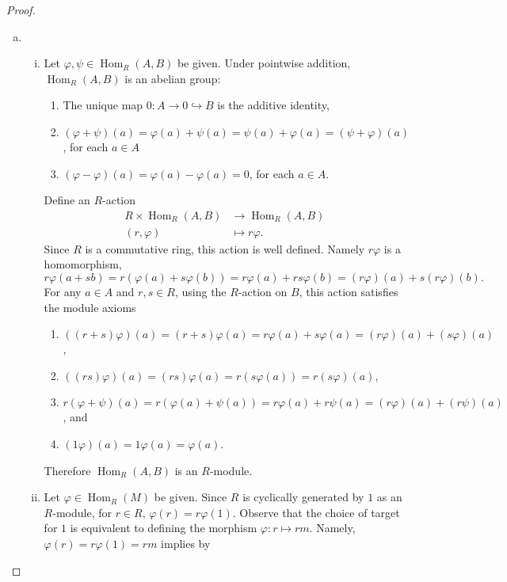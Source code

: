 \documentclass[10pt]{amsart}
\newcommand{\Hom}[2]{\operatorname{Hom}_{#1}\left(#2\right)}
\begin{document}
\begin{thm}
\begin{proof}
	\begin{enumerate}[(a)]
		\item
		\begin{enumerate}[(i)]
			\item
				Let $\varphi, \psi \in \Hom{R}{A,B}$ be given.
				Under pointwise addition, $\Hom{R}{A,B}$ is an abelian group:
				\begin{enumerate}
					\item
						The unique map $0 \colon A \rightarrow 0 \hookrightarrow B$ is the additive identity,
					\item
						$(\varphi + \psi)(a) = \varphi(a) + \psi(a) = \psi(a) + \varphi(a) = (\psi + \varphi)(a)$, for each $a \in A$
					\item
						$(\varphi - \varphi)(a) = \varphi(a) - \varphi(a) = 0$, for each $a \in A$.
				\end{enumerate}
				Define an $R$-action
				\begin{align*}
					R \times \Hom{R}{A,B} &\rightarrow \Hom{R}{A,B}\\
					(r, \varphi) &\mapsto r\varphi.
				\end{align*}
				Since $R$ is a commutative ring, this action is well defined.  Namely $r\varphi$ is a homomorphism,
				$$r\varphi(a + sb) = r(\varphi(a) + s\varphi(b)) = r\varphi(a) + rs\varphi(b) = (r\varphi)(a) + s(r\varphi)(b).$$
				For any $a \in A$ and $r, s \in R$, using the $R$-action on $B$, this action satisfies the module axioms
				\begin{enumerate}
					\item
						$((r + s)\varphi)(a) = (r + s)\varphi(a) = r\varphi(a) + s\varphi(a) = (r\varphi)(a) + (s\varphi)(a)$,
					\item
						$((rs)\varphi)(a) = (rs)\varphi(a) = r(s\varphi(a)) = r(s\varphi)(a)$,
					\item
						$r(\varphi + \psi)(a) = r(\varphi(a) + \psi(a)) = r\varphi(a) + r\psi(a) = (r\varphi)(a) + (r\psi)(a)$, and
					\item
						$(1\varphi)(a) = 1 \varphi(a) = \varphi(a)$.
				\end{enumerate}
				Therefore $\Hom{R}{A,B}$ is an $R$-module.
			\item
				Let $\varphi \in \Hom{R}{M}$ be given.
				Since $R$ is cyclically generated by $1$ as an $R$-module, for $r \in R$, $\varphi(r) = r\varphi(1)$.
				Observe that the choice of target for $1$ is equivalent to defining the morphism $\varphi \colon r \mapsto rm$.
				Namely, $\varphi(r) = r\varphi(1) = rm$ implies by 
		\end{enumerate}
	\end{enumerate}
\end{proof}

\end{thm}
\end{document}
